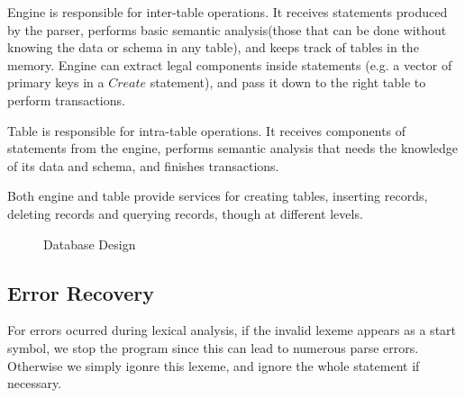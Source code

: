 \documentclass{article}
\begin{document}
Engine is responsible for inter-table operations. It receives statements produced by the parser, performs basic semantic analysis(those that can be done without knowing the data or schema in any table), and keeps track of tables in the memory. Engine can extract legal components inside statements (e.g. a vector of primary keys in a $Create$ statement), and pass it down to the right table to perform transactions.

Table is responsible for intra-table operations. It receives components of statements from the engine, performs semantic analysis that needs the knowledge of its data and schema, and finishes transactions.

Both engine and table provide services for creating tables, inserting records, deleting records and querying records, though at different levels.

\begin{figure}[H]
\centering
{}
\caption{Database Design}
\label{fig:db}
\end{figure}

\subsection{Error Recovery}

For errors ocurred during lexical analysis, if the invalid lexeme appears as a start symbol, we stop the program since this can lead to numerous parse errors. Otherwise we simply igonre this lexeme, and ignore the whole statement if necessary.
\end{document}
